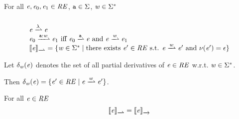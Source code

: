 \begin{definition}
 For all $\mathit {e},\mathit {e}_0,\mathit {e}_1\in\mathit {RE}$, $\mathtt {a}\in\Sigma$, $\mathit {w}\in\Sigma^*$
 \[
  \begin{array}{l}
   \\
   \re\parDer{\emptyWord}\re                                                                                       \\
   \re_0\parDer{\sym\strcons\word}\re_1 \mbox{ iff } \re_0\parDer{\sym}{}\re \mbox{ and } \re\parDer{\word}{}\re_1 \\
   \opSem{\re}{\parDer{}}=\{\word\in\wordUniv \mid \mbox{there exists } \re'\in\reSet \mbox{ s.t. } \re\parDer{\word}\re' \mbox{ and } \hasEps{\re'}=\eps\}
  \end{array}
 \]
\end{definition}


\begin{proposition}
 Let $\delta_{\mathit {w}}(\mathit {e})$ denotes the set of all partial derivatives of $\mathit {e}\in\mathit {RE}$ w.r.t. $\mathit {w}\in\Sigma^*$.

 Then $\delta_\word(\re)=\{\re'\in\reSet \mid \re\parDer{\word}\re'\}$.
\end{proposition}


\begin{theorem}
 For all $\mathit {e}\in\mathit {RE}$
 \[
  \opSem{\re}{\parDer{}{}}=\opSem{\re}{\der{}}
 \]
\end{theorem}

